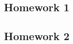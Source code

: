 \newcommand{\pd}[2]{\frac{\partial #1}{\partial #2}}
\newcommand{\pdd}[2]{\frac{\partial^2 #1}{\partial #2^2}}
\newcommand{\diff}{\mathrm{d}}


\subsection*{Homework 1}
\begin{enumerate}
    
\end{enumerate}

\subsection*{Homework 2}
\begin{enumerate}
    
\end{enumerate}


